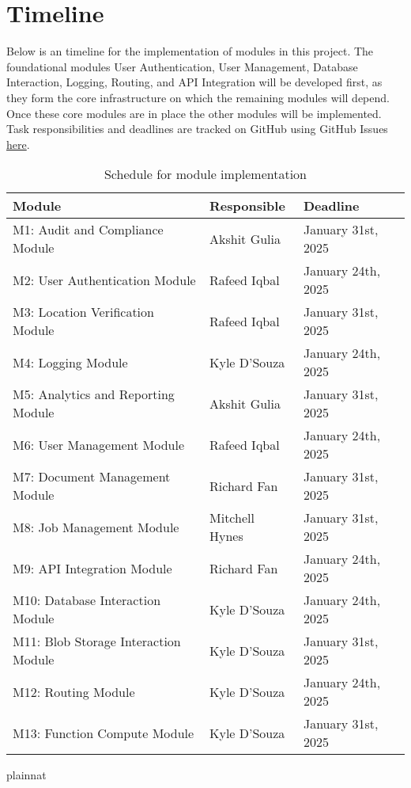 \documentclass[12pt, titlepage]{article}
\begin{document}
\section{Timeline}
Below is an timeline for the implementation of modules in this
project. The foundational modules User Authentication, User
Management, Database Interaction, Logging, Routing, and API
Integration will be developed first, as they form the core
infrastructure on which the remaining modules will depend. Once these
core modules are in place the other modules will be implemented. Task
responsibilities and deadlines are tracked on GitHub using GitHub
Issues \href{https://github.com/Spitgranger/SyncMaster/issues}{here}.
\begin{table}[H]
  \centering
  \begin{tabular}{|l|l|l|}
    \hline
    \textbf{Module} & \textbf{Responsible} & \textbf{Deadline} \\
    \hline
    M1: Audit and Compliance Module  & Akshit Gulia & January 31st, 2025 \\
    \hline
    M2: User Authentication Module    & Rafeed Iqbal & January 24th, 2025 \\
    \hline
    M3: Location Verification Module  & Rafeed Iqbal & January 31st, 2025 \\
    \hline
    M4: Logging Module                & Kyle D'Souza & January 24th, 2025 \\
    \hline
    M5: Analytics and Reporting Module & Akshit Gulia & January 31st, 2025 \\
    \hline
    M6: User Management Module        & Rafeed Iqbal & January 24th, 2025 \\
    \hline
    M7: Document Management Module    & Richard Fan & January 31st, 2025 \\
    \hline
    M8: Job Management Module         & Mitchell Hynes & January 31st, 2025 \\
    \hline
    M9: API Integration Module        & Richard Fan & January 24th, 2025 \\
    \hline
    M10: Database Interaction Module  & Kyle D'Souza & January 24th, 2025 \\
    \hline
    M11: Blob Storage Interaction Module & Kyle D'Souza & January 31st, 2025 \\
    \hline
    M12: Routing Module               & Kyle D'Souza & January 24th, 2025 \\
    \hline
    M13: Function Compute Module      & Kyle D'Souza & January 31st, 2025 \\
    \hline
  \end{tabular}
  \caption{Schedule for module implementation}
  \label{TblTimeline}
\end{table}

 {plainnat}


\newpage{}
\end{document}
